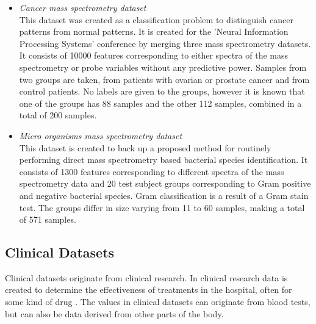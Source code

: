 \documentclass[10pt,a4paper]{report}
\begin{document}
	\begin{itemize}
		\item \textit{Cancer mass spectrometry dataset} \\ This dataset was created as a classification problem to distinguish cancer patterns from normal patterns\cite{NIPS2004_2728}. It is created for the 'Neural Information Processing Systems' conference by merging three mass spectrometry datasets. It consists of 10000 features corresponding to either spectra of the mass spectrometry or probe variables without any predictive power. Samples from two groups are taken, from patients with ovarian or prostate cancer and from control patients. No labels are given to the groups, however it is known that one of the groups has 88 samples and the other 112 samples, combined in a total of 200 samples.
		\item \textit{Micro organisms mass spectrometry dataset} \\ This dataset is created to back up a proposed method for routinely performing direct mass spectrometry based bacterial species identification\cite{doi:10.1093/bioinformatics/btu022}. It consists of 1300 features corresponding to different spectra of the mass spectrometry data and 20 test subject groups corresponding to Gram positive and negative bacterial species. Gram classification is a result of a Gram stain test\cite{madigan2017brock}. The groups differ in size varying from 11 to 60 samples, making a total of 571 samples.
	\end{itemize}
		
	
	\subsection{Clinical Datasets}
	\label{PLsubsec:Clinical}
	
	Clinical datasets originate from clinical research\cite{liu2012data, sittig2008grand}. In clinical research data is created to determine the effectiveness of treatments in the hospital, often for some kind of drug \cite{pocock2013clinical}. The values in clinical datasets can originate from blood tests\cite{bendele1999efficacy}, but can also be data derived from other parts of the body.  
	
\end{document}
